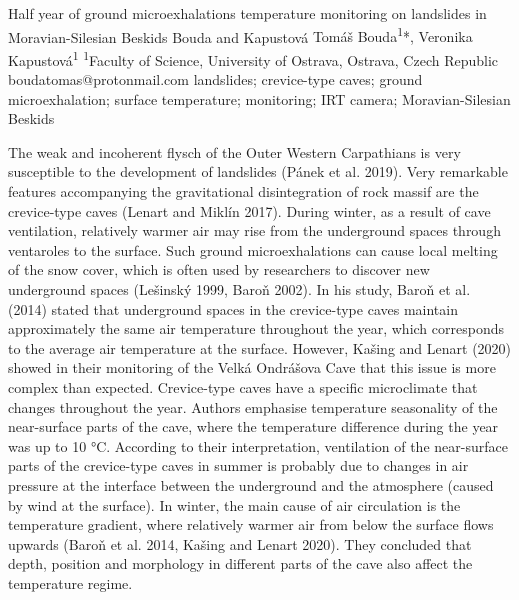 \abstract
{Half year of ground microexhalations temperature monitoring on landslides in Moravian-Silesian Beskids} 
{Bouda and Kapustová} 
{Tomáš Bouda\textsuperscript{1}*, Veronika Kapustová\textsuperscript{1}} 
{\POtag} 
{
\textsuperscript{1}Faculty of Science, University of Ostrava, Ostrava, Czech Republic
}
{boudatomas@protonmail.com}  %
{landslides; crevice-type caves; ground microexhalation; surface temperature; monitoring; IRT camera; Moravian-Silesian Beskids}
{The weak and incoherent flysch of the Outer Western Carpathians is very susceptible to the development of landslides (Pánek et al. 2019). Very remarkable features accompanying the gravitational disintegration of rock massif are the crevice-type caves (Lenart and Miklín 2017). During winter, as a result of cave ventilation, relatively warmer air may rise from the underground spaces through ventaroles to the surface. Such ground microexhalations can cause local melting of the snow cover, which is often used by researchers to discover new underground spaces (Lešinský 1999, Baroň 2002). In his study, Baroň et al. (2014) stated that underground spaces in the crevice-type caves maintain approximately the same air temperature throughout the year, which corresponds to the average air temperature at the surface. However, Kašing and Lenart (2020) showed in their monitoring of the Velká Ondrášova Cave that this issue is more complex than expected. Crevice-type caves have a specific microclimate that changes throughout the year. Authors emphasise temperature seasonality of the near-surface parts of the cave, where the temperature difference during the year was up to 10 °C. According to their interpretation, ventilation of the near-surface parts of the crevice-type caves in summer is probably due to changes in air pressure at the interface between the underground and the atmosphere (caused by wind at the surface). In winter, the main cause of air circulation is the temperature gradient, where relatively warmer air from below the surface flows upwards (Baroň et al. 2014, Kašing and Lenart 2020). They concluded that depth, position and morphology in different parts of the cave also affect the temperature regime.

}
